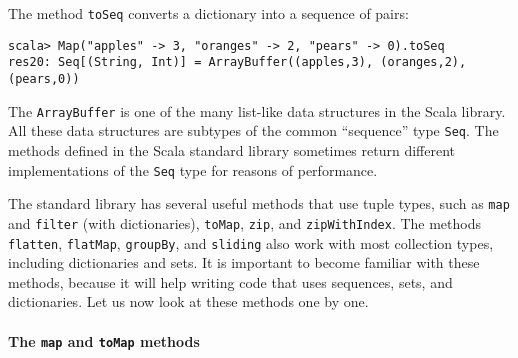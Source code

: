 The method \lstinline!toSeq! converts a dictionary into a sequence
of pairs:
\begin{lstlisting}
scala> Map("apples" -> 3, "oranges" -> 2, "pears" -> 0).toSeq
res20: Seq[(String, Int)] = ArrayBuffer((apples,3), (oranges,2), (pears,0))
\end{lstlisting}
The \lstinline!ArrayBuffer! is one of the many list-like data structures
in the Scala library. All these data structures are subtypes of the
common \textsf{``}sequence\textsf{''} type \lstinline!Seq!. The methods defined in
the Scala standard library sometimes return different implementations
of the \lstinline!Seq! type for reasons of performance.

The standard library has several useful methods that use tuple types,
such as \lstinline!map! and \lstinline!filter! (with dictionaries),
\lstinline!toMap!, \lstinline!zip!, and \lstinline!zipWithIndex!.
The methods \lstinline!flatten!, \lstinline!flatMap!, \lstinline!groupBy!,
and \lstinline!sliding! also work with most collection types, including
dictionaries and sets. It is important to become familiar with these
methods, because it will help writing code that uses sequences, sets,
and dictionaries. Let us now look at these methods one by one.

\paragraph*{The \texttt{map} and \texttt{toMap} methods}

